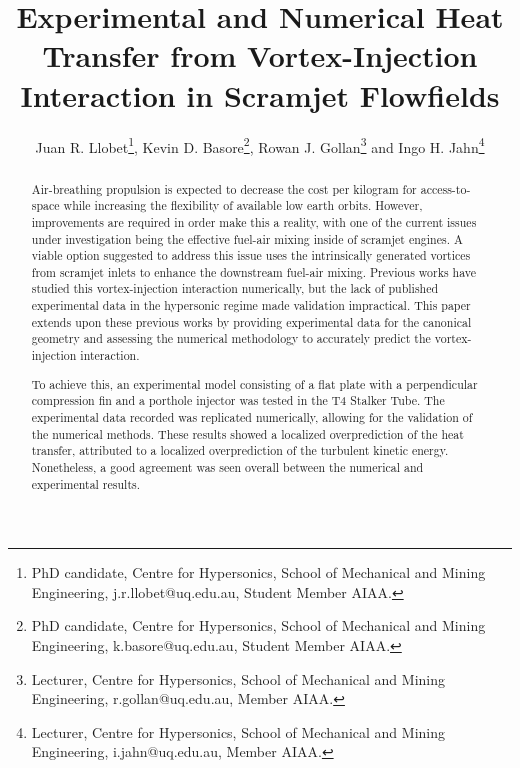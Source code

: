 \documentclass{AIAA}
\begin{document}
\title{Experimental and Numerical Heat Transfer from Vortex-Injection Interaction in Scramjet Flowfields}

\author{Juan R. Llobet\footnote{PhD candidate, Centre for Hypersonics, School of Mechanical and Mining Engineering, j.r.llobet@uq.edu.au, Student Member AIAA.}, Kevin D. Basore\footnote{PhD candidate, Centre for Hypersonics, School of Mechanical and Mining Engineering, k.basore@uq.edu.au, Student Member AIAA.}, Rowan J. Gollan\footnote{Lecturer, Centre for Hypersonics, School of Mechanical and Mining Engineering, r.gollan@uq.edu.au, Member AIAA.} and Ingo H. Jahn\footnote{Lecturer, Centre for Hypersonics, School of Mechanical and Mining Engineering, i.jahn@uq.edu.au, Member AIAA.}}

\begin{abstract}


Air-breathing propulsion is expected to decrease the cost per kilogram for access-to-space while increasing the flexibility of available low earth orbits.
However, improvements are required in order make this a reality, with one of the current issues under investigation being the effective fuel-air mixing inside of scramjet engines.
A viable option suggested to address this issue uses the intrinsically generated vortices from scramjet inlets to enhance the downstream fuel-air mixing.
Previous works have studied this vortex-injection interaction numerically, but the lack of published experimental data in the hypersonic regime made validation impractical.
This paper extends upon these previous works by providing experimental data for the canonical geometry and assessing the numerical methodology to accurately predict the vortex-injection interaction.


To achieve this, an experimental model consisting of a flat plate with a perpendicular compression fin and a porthole injector was tested in the T4 Stalker Tube.
The experimental data recorded was replicated numerically, allowing for the validation of the numerical methods.
These results showed a localized overprediction of the heat transfer, attributed to a localized overprediction of the turbulent kinetic energy.
Nonetheless, a good agreement was seen overall between the numerical and experimental results. 


\end{abstract}

\maketitle
\end{document}
